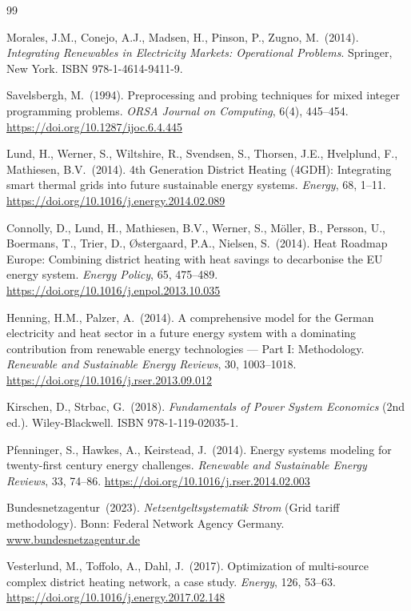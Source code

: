 \documentclass[a4paper,12pt]{article}
\begin{document}
\begin{thebibliography}{99}

Morales, J.M., Conejo, A.J., Madsen, H., Pinson, P., Zugno, M.\ (2014).
\textit{Integrating Renewables in Electricity Markets: Operational Problems}.
Springer, New York. ISBN 978-1-4614-9411-9.

Savelsbergh, M.\ (1994).
Preprocessing and probing techniques for mixed integer programming problems.
\textit{ORSA Journal on Computing}, 6(4), 445--454.
\url{https://doi.org/10.1287/ijoc.6.4.445}

Lund, H., Werner, S., Wiltshire, R., Svendsen, S., Thorsen, J.E., Hvelplund, F.,
Mathiesen, B.V.\ (2014).
4th Generation District Heating (4GDH): Integrating smart thermal grids into future
sustainable energy systems.
\textit{Energy}, 68, 1--11.
\url{https://doi.org/10.1016/j.energy.2014.02.089}

Connolly, D., Lund, H., Mathiesen, B.V., Werner, S., M\"{o}ller, B., Persson, U.,
Boermans, T., Trier, D., \O{}stergaard, P.A., Nielsen, S.\ (2014).
Heat Roadmap Europe: Combining district heating with heat savings to decarbonise the EU
energy system.
\textit{Energy Policy}, 65, 475--489.
\url{https://doi.org/10.1016/j.enpol.2013.10.035}

Henning, H.M., Palzer, A.\ (2014).
A comprehensive model for the German electricity and heat sector in a future energy system
with a dominating contribution from renewable energy technologies --- Part I: Methodology.
\textit{Renewable and Sustainable Energy Reviews}, 30, 1003--1018.
\url{https://doi.org/10.1016/j.rser.2013.09.012}

Kirschen, D., Strbac, G.\ (2018).
\textit{Fundamentals of Power System Economics} (2nd ed.). Wiley-Blackwell.
ISBN 978-1-119-02035-1.

Pfenninger, S., Hawkes, A., Keirstead, J.\ (2014).
Energy systems modeling for twenty-first century energy challenges.
\textit{Renewable and Sustainable Energy Reviews}, 33, 74--86.
\url{https://doi.org/10.1016/j.rser.2014.02.003}

Bundesnetzagentur\ (2023).
\textit{Netzentgeltsystematik Strom} (Grid tariff methodology).
Bonn: Federal Network Agency Germany. \url{www.bundesnetzagentur.de}

Vesterlund, M., Toffolo, A., Dahl, J.\ (2017).
Optimization of multi-source complex district heating network, a case study.
\textit{Energy}, 126, 53--63.
\url{https://doi.org/10.1016/j.energy.2017.02.148}


\end{thebibliography}
\end{document}
